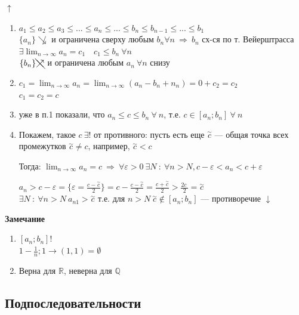 \documentclass{article}
\begin{document}
    \(\uparrow\)
    \begin{enumerate}
        \item \(a_1 \leq a_2 \leq a_3 \leq ... \leq a_n \leq ... \leq b_n \leq b_{n-1} \leq ... \leq b_1\)\\
    \(\{ a_n \} \not\searrow\) и ограничена сверху любым \(b_n \forall n\ \Rightarrow\ b_n\) сх-ся по т. Вейерштрасса
    \\\(\exists \lim_{n \rightarrow \infty}{a_n} = c_1 \quad c_1 \leq b_n \ \forall n\)
    \\\(\{b_n\} \bcancel{\nearrow}\) и ограничена любым \(a_n\ \forall n\) снизу
        \item \( c_1 = \lim_{n \rightarrow \infty} a_n = \lim_{n \rightarrow \infty} (a_n - b_n + n_n) = 0 + c_2 = c_2 \)\\
    \( c_1 = c_2 = c \)\\
        \item уже в п.1 показали, что \(a_n \leq c \leq b_n\ \forall\ n\), т.е. \( c \in [a_n; b_n]\ \forall\ n \)
        
        \item Покажем, такое \( c\ \exists! \) от противного: пусть есть еще \( \overset{\sim}{c} \) --- общая точка всех промежутков \( \overset{\sim}{c} \neq c \), например, \( \overset{\sim}{c} < c \)

    Тогда: \(\lim_{n \rightarrow \infty}{a_n} = c\ \Rightarrow\ \forall \varepsilon > 0 \ \exists N\ :\ \forall n > N, c - \varepsilon < a_n < c + \varepsilon\)

    \(a_n > c - \varepsilon = \{\varepsilon = \frac{c-\overset{\sim}{c}}{2}\} = c - \frac{c - \overset{\sim}{c}}{2} = \frac{c + \overset{\sim}{c}}{2} > \frac{2c^{~}}{2} = \overset{\sim}{c}\)
    \\\(\exists N\ :\ \forall n > N\ a_{n1} > \overset{\sim}{c}\) т.е. для \(n > N\ \overset{\sim}{c} \not\in [a_n; b_n]\) --- противоречие \(\downarrow\)
    \end{enumerate}

    \textbf{Замечание}
	\begin{enumerate}
    	\item \( [a_n; b_n]! \)\\
    	\( 1 - \frac{1}{n}; 1 \rightarrow (1, 1) = \emptyset \)
    	\item Верна для \(\mathbb{R}\), неверна для \(\mathbb{Q}\)
    \end{enumerate}
    
    \subsection{Подпоследовательности}
    
\end{document}
